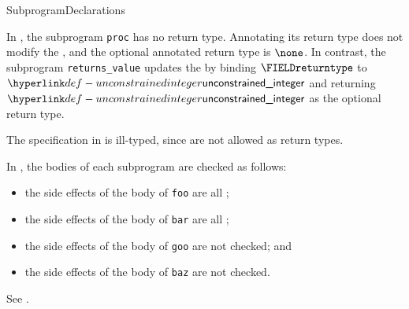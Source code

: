 \begin{TypingRuleList}{SubprogramDeclarations}


In , the subprogram \verb|proc| has no return type.
Annotating its return type does not modify the \staticenvironmentterm{}, and the optional annotated return type is $\none$.
In contrast, the subprogram \verb|returns_value| updates the \staticenvironmentterm{} by
binding $\FIELDreturntype$ to $\unconstrainedinteger$ and returning $\unconstrainedinteger$
as the optional return type.

The specification in  is ill-typed, since \collectiontypesterm{} are not allowed
as return types.




In , the bodies of each subprogram are checked as follows:
\begin{itemize}
  \item the side effects of the body of \verb|foo| are all \pureterm{};
  \item the side effects of the body of \verb|bar| are all \readonlyterm{};
  \item the side effects of the body of \verb|goo| are not checked; and
  \item the side effects of the body of \verb|baz| are not checked.
\end{itemize}




See .






\end{TypingRuleList}
